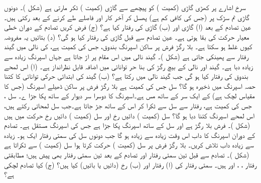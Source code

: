 سرخ اشارے پر کھڑی گاڑی      (کمیت ) کو پیچھے سے گاڑی  (کمیت ) ٹکر مارتی ہے (شکل )۔ دونوں گاڑی  نم سڑک پر (جس کی  کافی کم ہے)   پھسل  کر آخر کار
   اور 
    فاصلے طے کرنے کے بعد رکتی  ہیں۔ عین  تصادم  کے بعد  (ا) گاڑی  اور (ب) گاڑی   کی رفتار کیا ہے؟ (ج)  فرض کریں تصادم کے دوران خطی معیار حرکت کی بقا ہوتی ہے۔ عین تصادم سے قبل گاڑی   کی رفتار کیا  ہو گی؟ (د)  بتائیں یہ مفروضہ کیوں غلط ہو سکتا ہے۔
بلا رگڑ فرش پر  ساکن  اسپرنگ بندوق، جس کی کمیت  ہے،  کی نالی میں  گیند  رفتار سے  پھینکی جاتی ہے (شکل )۔ گیند نالی میں اس مقام پر اڑ جاتا ہے جہاں اسپرنگ زیادہ سے زیادہ دبا ہے۔ گیند اور نالی کے بیچ رگڑ کی بنا حر توانائی میں اضافہ قابل نظرانداز ہے۔ (ا) اس لمحے  بندوق کی رفتار کیا ہو گی جب گیند نالی میں رکتا ہے؟ (ب)  گیند کی ابتدائی حرکی توانائی کا کتنا حصہ اسپرنگ میں ذخیرہ ہو گا؟
سل  جس کی کمیت  ہے بلا رگڑ فرش پر ساکن ڈھیلے  اسپرنگ (جس کا مقیاس لچک  ہے) کے ایک سر کے ساتھ مس  ہے۔اسپرنگ کا  دوسرا سر دیوار کے ساتھ پکا جڑا ے۔ سل   ، جس کی کمیت  ہے،  رفتار سے سل  سے ٹکرا کر اس کے ساتھ جڑ جاتا ہے۔جب  سل  لمحاتی رکتے ہیں، اس لمحے اسپرنگ کتنا دبا ہو گا؟
سل (کمیت )   دائیں رخ  اور سل (کمیت )   دائیں رخ  حرکت میں ہیں (شکل )۔ فرش بلا رگڑ ہے اور سل  کے ساتھ اسپرنگ پکا   جڑا ہے جس کی اسپرنگ مستقل  ہے۔ تصادم کے دوران اسپرنگ کا داب  اس وقت زیادہ سے زیادہ ہو گا جب  دونوں سل کی سمتی  رفتار ایک ہو۔ زیادہ سے زیادہ  داب تلاش کریں۔
بلا رگڑ فرش پر  سل  (کمیت )  حرکت کرتا ہوا سل    (کمیت ) سے ٹکراتا ہے (شکل )۔ تصادم سے قبل تین سمتی رفتار   اور تصادم کے بعد تین سمتی رفتار  بھی پیش ہیں؛ مطابقتی رفتار ، ، اور  ہیں۔  سمتی رفتار  کی (ا) رفتار  اور (ب) رخ (دائیں یا بائیں) کیا ہیں؟ (ج) کیا تصادم لچکی ہے؟
